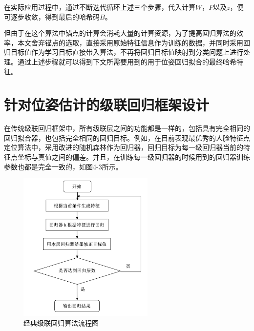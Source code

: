 在实际应用过程中，通过不断迭代循环上述三个步骤，代入计算$W$，$P$以及$z$，便可逐步收敛，得到最后的哈希码$B$。

但由于在这个算法中锚点的计算会消耗大量的计算资源，为了提高回归算法的效率，本文舍弃锚点的选取，直接采用原始特征信息作为训练的数据，并同时采用回归目标值作为学习目标直接带入算法，不再将回归目标值映射到分类问题上进行处理。通过上述步骤就可以得到下文所需要用到的用于位姿回归拟合的最终哈希特征。

\section{针对位姿估计的级联回归框架设计}

在传统级联回归框架中，所有级联层之间的功能都是一样的，包括具有完全相同的回归拟合器，也包括完全相同的回归目标。例如，在目前表现最优秀的人脸特征点定位算法中\cite{chen2014joint}，采用改进的随机森林作为回归器，回归目标为每一级回归器当前的特征点坐标与真值之间的偏差。并且，在训练每一级回归器的时候用到的回归器训练参数也都是完全一致的，如图4-3所示。

\begin{figure}[htb]
	\centering 
	\includegraphics[width=0.6\textwidth]{./mypic/经典级联回归算法流程图.jpg} 
	\caption{经典级联回归算法流程图} 
\end{figure}

